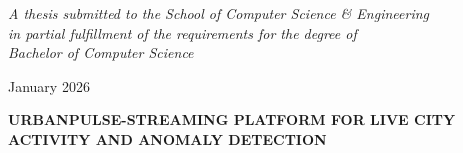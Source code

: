 \documentclass[12pt, twoside]{report}
\begin{document}
\begin{titlepage}
	\vspace{4.5cm}
	\textit{A thesis submitted to the School of Computer Science \& Engineering \\ in partial
		fulfillment of the requirements for the degree of \\ Bachelor of Computer Science}
														
	\vspace{4.5cm}
	 \par January 2026
														
	\newpage
													
	\centering
														
	\textbf{\large URBANPULSE-STREAMING PLATFORM FOR LIVE CITY ACTIVITY AND ANOMALY DETECTION}\par
	\vspace{4cm}
														
	\hspace{7cm}
	\par
	\vspace{2cm}
														
	\hspace{7cm}
	\makebox[7cm][l]{\underline{\hspace{7cm}}}
	\par \hspace{7cm}
	\par
	\vspace{2cm}
														
	\hspace{7cm}
	\makebox[7cm][l]{\underline{\hspace{7cm}}}
	\par \hspace{7cm}
	\par
	\vspace{2cm}
														
	\hspace{7cm}
	\makebox[7cm][l]{\underline{\hspace{7cm}}}
	\par \hspace{7cm}
	\par
	\vspace{2cm}
														
	\hspace{7cm}
	\makebox[7cm][l]{\underline{\hspace{7cm}}}
	\par \hspace{7cm}
	\par
	\vspace{2cm}
			

\end{titlepage}
\end{document}
